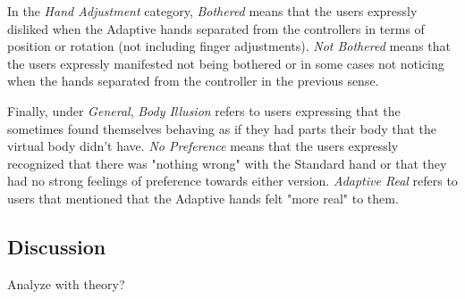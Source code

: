 In the \textit{Hand Adjustment} category, \textit{Bothered} means that the users expressly disliked when the Adaptive hands separated from the controllers in terms of position or rotation (not including finger adjustments). \textit{Not Bothered} means that the users expressly manifested not being bothered or in some cases not noticing when the hands separated from the controller in the previous sense.

Finally, under \textit{General}, \textit{Body Illusion} refers to users expressing that the sometimes found themselves behaving as if they had parts their body that the virtual body didn't have. \textit{No Preference} means that the users expressly recognized that there was "nothing wrong" with the Standard hand or that they had no strong feelings of preference towards either version. \textit{Adaptive Real} refers to users that mentioned that the Adaptive hands felt "more real" to them.

\subsection{Discussion}
\label{subsec:discussion}

Analyze with theory?